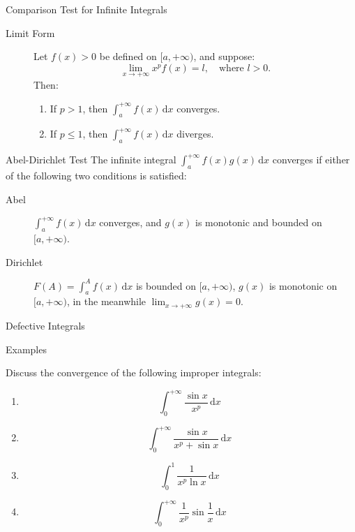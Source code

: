 \documentclass[11pt]{../../TexTemplate/elegantbook}
\begin{document}
\begin{theorem}{Comparison Test for Infinite Integrals}
\begin{description}
    \item[Limit Form] Let \( f(x) > 0 \) be defined on \( [a, +\infty) \), and suppose:
    \[
    \lim_{x \to +\infty} x^p f(x) = l, \quad \text{where } l > 0.
    \]
    Then:
    \begin{enumerate}[label=\roman*)]
        \item If \( p > 1 \), then \( \int_{a}^{+\infty} f(x) \, \mathrm{d}x \) converges.
        \item If \( p \leqslant 1 \), then \( \int_{a}^{+\infty} f(x) \, \mathrm{d}x \) diverges.
    \end{enumerate}
\end{description}
\end{theorem}

\begin{theorem}{Abel-Dirichlet Test}
    The infinite integral \( \int_{a}^{+\infty} f(x)g(x) \, \mathrm{d}x \) converges 
    if either of the following two conditions is satisfied:
    \begin{description}
        \item [Abel] \( \int_{a}^{+\infty} f(x) \, \mathrm{d}x \) converges, 
            and \( g(x) \) is monotonic and bounded on \( [a, +\infty) \).
        \item [Dirichlet] \( F(A) = \int_{a}^{A} f(x) \, \mathrm{d}x \) is bounded on \( [a, +\infty) \), 
            \( g(x) \) is monotonic on \( [a, +\infty) \), in the meanwhile \( \lim_{x \to +\infty} g(x) = 0 \).
    \end{description}
\end{theorem}


\begin{leftbarTitle}{Defective Integrals}\end{leftbarTitle}


\begin{leftbarTitle}{Examples}\end{leftbarTitle}
\begin{example}
    Discuss the convergence of the following improper integrals:
    \begin{enumerate}
        \item \[ \int_{0}^{+\infty} \frac{\sin x}{x^p} \, \mathrm{d}x \]
        \item \[ \int_{0}^{+\infty} \frac{\sin x}{x^p + \sin x} \, \mathrm{d}x \]
        \item \[ \int_{0}^{1} \frac{1}{x^p \ln x} \, \mathrm{d}x \]
        \item \[ \int_{0}^{+\infty} \frac{1}{x^p}\sin \frac{1}{x} \, \mathrm{d}x \]
    \end{enumerate}
\end{example}
\end{document}
